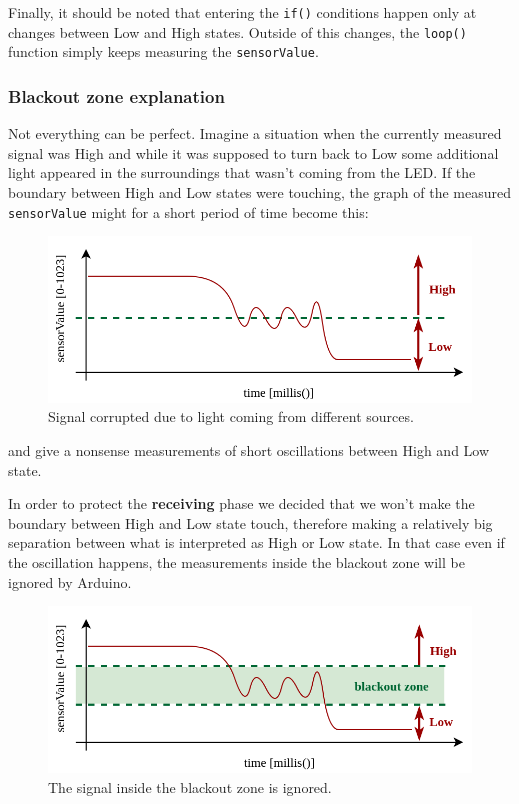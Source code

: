 \documentclass[12pt]{report}
\begin{document}
Finally, it should be noted that entering the \verb|if()| conditions happen only at changes between Low and High states. Outside of this changes, the \verb|loop()| function simply keeps measuring the \verb|sensorValue|.

\subsubsection{Blackout zone explanation}

Not everything can be perfect. Imagine a situation when the currently measured signal was High and while it was supposed to turn back to Low some additional light appeared in the surroundings that wasn't coming from the LED. If the boundary between High and Low states were touching, the graph of the measured \texttt{sensorValue} might for a short period of time become this:

\begin{figure}[H]
\centering\includegraphics[width=14.5cm]{blackoutZone.png}
\caption{Signal corrupted due to light coming from different sources.}				
\label{fig:blackoutzone}
\end{figure}

and give a nonsense measurements of short oscillations between High and Low state.

In order to protect the \textbf{receiving} phase we decided that we won't make the boundary between High and Low state touch, therefore making a relatively big separation between what is interpreted as High or Low state. In that case even if the oscillation happens, the measurements inside the blackout zone will be ignored by Arduino.

\begin{figure}[H]
\centering\includegraphics[width=14.5cm]{blackoutZoneIgnored.png}
\caption{The signal inside the blackout zone is ignored.}				
\label{fig:blackoutzoneignored}
\end{figure}
\end{document}
